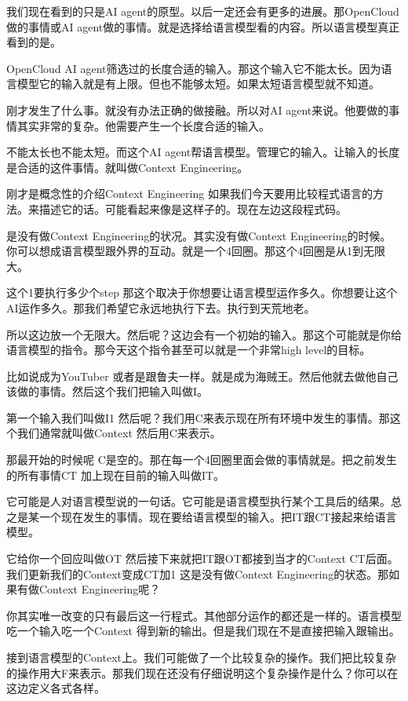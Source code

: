 \documentclass[12pt,a4paper]{article}
\begin{document}
我们现在看到的只是AI agent的原型。以后一定还会有更多的进展。那OpenCloud做的事情或AI agent做的事情。就是选择给语言模型看的内容。所以语言模型真正看到的是。

OpenCloud AI agent筛选过的长度合适的输入。那这个输入它不能太长。因为语言模型它的输入就是有上限。但也不能够太短。如果太短语言模型就不知道。

刚才发生了什么事。就没有办法正确的做接融。所以对AI agent来说。他要做的事情其实非常的复杂。他需要产生一个长度合适的输入。

不能太长也不能太短。而这个AI agent帮语言模型。管理它的输入。让输入的长度是合适的这件事情。就叫做Context Engineering。

刚才是概念性的介绍Context Engineering 如果我们今天要用比较程式语言的方法。来描述它的话。可能看起来像是这样子的。现在左边这段程式码。

是没有做Context Engineering的状况。其实没有做Context Engineering的时候。你可以想成语言模型跟外界的互动。就是一个4回圈。那这个4回圈是从1到无限大。

这个1要执行多少个step 那这个取决于你想要让语言模型运作多久。你想要让这个AI运作多久。那我们希望它永远地执行下去。执行到天荒地老。

所以这边放一个无限大。然后呢？这边会有一个初始的输入。那这个可能就是你给语言模型的指令。那今天这个指令甚至可以就是一个非常high level的目标。

比如说成为YouTuber 或者是跟鲁夫一样。就是成为海贼王。然后他就去做他自己该做的事情。然后这个我们把输入叫做I。

第一个输入我们叫做I1 然后呢？我们用C来表示现在所有环境中发生的事情。那这个我们通常就叫做Context 然后用C来表示。

那最开始的时候呢 C是空的。那在每一个4回圈里面会做的事情就是。把之前发生的所有事情CT 加上现在目前的输入叫做IT。

它可能是人对语言模型说的一句话。它可能是语言模型执行某个工具后的结果。总之是某一个现在发生的事情。现在要给语言模型的输入。把IT跟CT接起来给语言模型。

它给你一个回应叫做OT 然后接下来就把IT跟OT都接到当才的Context CT后面。我们更新我们的Context变成CT加1 这是没有做Context Engineering的状态。那如果有做Context Engineering呢？

你其实唯一改变的只有最后这一行程式。其他部分运作的都还是一样的。语言模型吃一个输入吃一个Context 得到新的输出。但是我们现在不是直接把输入跟输出。

接到语言模型的Context上。我们可能做了一个比较复杂的操作。我们把比较复杂的操作用大F来表示。那我们现在还没有仔细说明这个复杂操作是什么？你可以在这边定义各式各样。
\end{document}
